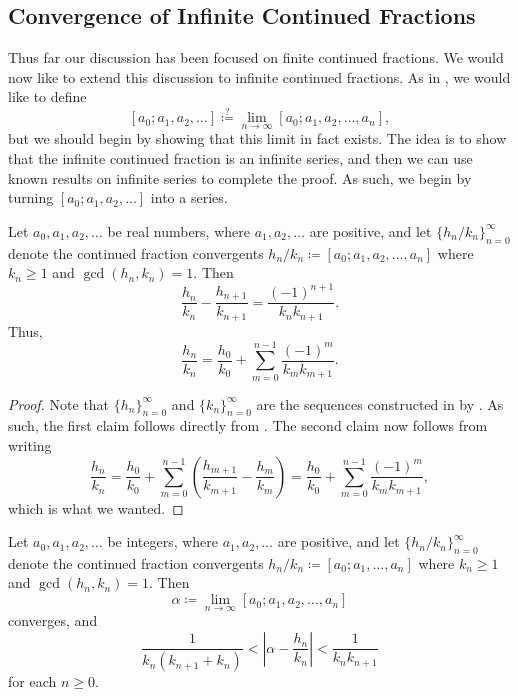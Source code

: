 \documentclass[../notes.tex]{subfiles}
\begin{document}
\subsection{Convergence of Infinite Continued Fractions}
Thus far our discussion has been focused on finite continued fractions. We would now like to extend this discussion to infinite continued fractions. As in , we would like to define
\[[a_0;a_1,a_2,\ldots]\stackrel?\coloneqq\lim_{n\to\infty}[a_0;a_1,a_2,\ldots,a_n],\]
but we should begin by showing that this limit in fact exists. The idea is to show that the infinite continued fraction is an infinite series, and then we can use known results on infinite series to complete the proof. As such, we begin by turning $[a_0;a_1,a_2,\ldots]$ into a series.
\begin{lemma} \label{lem:convergent-diff}
	Let $a_0,a_1,a_2,\ldots$ be real numbers, where $a_1,a_2,\ldots$ are positive, and let $\{h_n/k_n\}_{n=0}^\infty$ denote the continued fraction convergents $h_n/k_n\coloneqq[a_0;a_1,a_2,\ldots,a_n]$ where $k_n\ge1$ and $\gcd(h_n,k_n)=1$. Then
	\[\frac{h_n}{k_n}-\frac{h_{n+1}}{k_{n+1}}=\frac{(-1)^{n+1}}{k_nk_{n+1}}.\]
	Thus,
	\[\frac{h_n}{k_n}=\frac{h_0}{k_0}+\sum_{m=0}^{n-1}\frac{(-1)^m}{k_mk_{m+1}}.\]
\end{lemma}
\begin{proof}
	Note that $\{h_n\}_{n=0}^\infty$ and $\{k_n\}_{n=0}^\infty$ are the sequences constructed in  by . As such, the first claim follows directly from . The second claim now follows from writing
	\[\frac{h_n}{k_n}=\frac{h_0}{k_0}+\sum_{m=0}^{n-1}\left(\frac{h_{m+1}}{k_{m+1}}-\frac{h_m}{k_m}\right)=\frac{h_0}{k_0}+\sum_{m=0}^{n-1}\frac{(-1)^{m}}{k_mk_{m+1}},\]
	which is what we wanted.
\end{proof}
\begin{proposition} \label{prop:basic-cf-bound}
	Let $a_0,a_1,a_2,\ldots$ be integers, where $a_1,a_2,\ldots$ are positive, and let $\{h_n/k_n\}_{n=0}^\infty$ denote the continued fraction convergents $h_n/k_n\coloneqq[a_0;a_1,\ldots,a_n]$ where $k_n\ge1$ and $\gcd(h_n,k_n)=1$. Then
	\[\alpha\coloneqq\lim_{n\to\infty}[a_0;a_1,a_2,\ldots,a_n]\]
	converges, and
	\[\frac1{k_n(k_{n+1}+k_n)}<\left|\alpha-\frac{h_n}{k_n}\right|<\frac1{k_nk_{n+1}}\]
	for each $n\ge0$.
\end{proposition}
\end{document}
